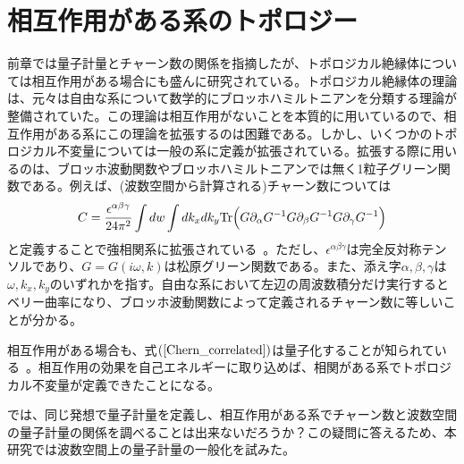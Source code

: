 \documentclass[12pt]{jsbook}
\newcommand{\pa}{\partial}
\begin{document}
\section{相互作用がある系のトポロジー}
前章では量子計量とチャーン数の関係を指摘したが、トポロジカル絶縁体については相互作用がある場合にも盛んに研究されている\cite{Rachel_2018,Hohenadler_2013}。トポロジカル絶縁体の理論は、元々は自由な系について数学的にブロッホハミルトニアンを分類する理論が整備されていた\cite{2016トポロジカル絶縁体}。この理論は相互作用がないことを本質的に用いているので、相互作用がある系にこの理論を拡張するのは困難である。しかし、いくつかのトポロジカル不変量については一般の系に定義が拡張されている。拡張する際に用いるのは、ブロッホ波動関数やブロッホハミルトニアンでは無く1粒子グリーン関数である\cite{PhysRevLett.105.256803,PhysRevX.2.031008,article,PhysRevB.92.085126}。例えば、(波数空間から計算される)チャーン数については
\begin{eqnarray}
\label{Chern_correlated}
    C={\epsilon^{\alpha\beta\gamma}\over 24\pi^2}\int dw\int dk_xdk_y \mathrm{Tr}\Big(G\pa_\alpha G^{-1}G\pa_\beta G^{-1}G\pa_\gamma G^{-1}\Big)
\end{eqnarray}
と定義することで強相関系に拡張されている~\cite{PhysRevLett.105.256803,PhysRevB.83.085426}。ただし、$\epsilon^{\alpha\beta\gamma}$は完全反対称テンソルであり、$G=G(i\omega,k)$は松原グリーン関数である。また、添え字$\alpha,\beta,\gamma$は$\omega,k_x,k_y$のいずれかを指す。自由な系において左辺の周波数積分だけ実行するとベリー曲率になり、ブロッホ波動関数によって定義されるチャーン数に等しいことが分かる。

相互作用がある場合も、式$(\ref{Chern_correlated})$は量子化することが知られている~\cite{PhysRevLett.105.256803,PhysRevB.83.085426}。相互作用の効果を自己エネルギーに取り込めば、相関がある系でトポロジカル不変量が定義できたことになる。

では、同じ発想で量子計量を定義し、相互作用がある系でチャーン数と波数空間の量子計量の関係を調べることは出来ないだろうか？この疑問に答えるため、本研究では波数空間上の量子計量の一般化を試みた。
\end{document}
